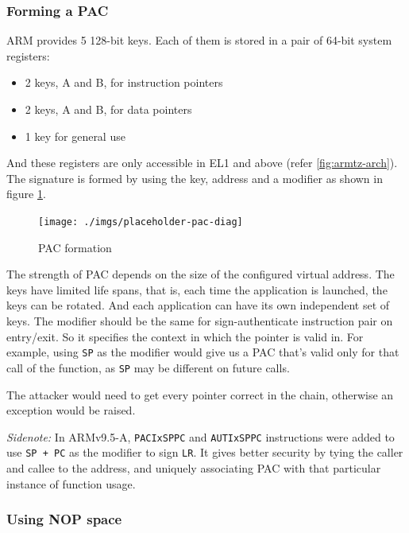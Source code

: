 \documentclass[a4paper, nobind]{templates/ociamthesis}
\providecommand{\tightlist}{%
  \setlength{\itemsep}{0pt}\setlength{\parskip}{0pt}}
\begin{document}
\subsubsection{Forming a PAC}\label{forming-a-pac}

ARM provides 5 128-bit keys. Each of them is stored in a pair of 64-bit system registers:

\begin{itemize}
\tightlist
\item
  2 keys, A and B, for instruction pointers
\item
  2 keys, A and B, for data pointers
\item
  1 key for general use
\end{itemize}

And these registers are only accessible in EL1 and above (refer \ref{fig:armtz-arch}).
The signature is formed by using the key, address and a modifier as shown in figure \ref{fig:pac-diag}.

\begin{figure}

{\centering \texttt{[image: ./imgs/placeholder-pac-diag]} 

}

\caption{PAC formation}\label{fig:pac-diag}
\end{figure}

The strength of PAC depends on the size of the configured virtual address.
The keys have limited life spans, that is, each time the application is launched, the keys can be rotated.
And each application can have its own independent set of keys.
The modifier should be the same for sign-authenticate instruction pair on entry/exit.
So it specifies the context in which the pointer is valid in. For example,
using \texttt{SP} as the modifier would give us a PAC that's valid only for that call of the function,
as \texttt{SP} may be different on future calls.

The attacker would need to get every pointer correct in the chain, otherwise an
exception would be raised.

\emph{Sidenote:}
In ARMv9.5-A, \texttt{PACIxSPPC} and \texttt{AUTIxSPPC} instructions were added to use \texttt{SP\ +\ PC}
as the modifier to sign \texttt{LR}.
It gives better security by tying the caller and callee to the address,
and uniquely associating PAC with that particular instance of function usage.

\subsubsection{Using NOP space}\label{using-nop-space}
\end{document}
